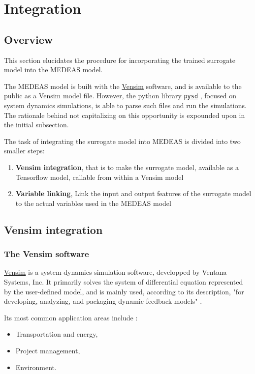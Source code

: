 \section{Integration}

\subsection{Overview}

This section elucidates the procedure for incorporating the trained surrogate model into the MEDEAS model.

The MEDEAS model is built with the \href{https://vensim.com/}{Vensim} software, and is available to the public as a Vensim model file. However, the python library \href{https://pysd.readthedocs.io/en/master/index.html}{\texttt{pysd}} \cite{pysd}, focused on system dynamics simulations, is able to parse such files and run the simulations. The rationale behind not capitalizing on this opportunity is expounded upon in the initial subsection.

The task of integrating the surrogate model into MEDEAS is divided into two smaller steps:
\begin{enumerate}
    \item \textbf{Vensim integration}, that is to make the surrogate model, available as a Tensorflow model, callable from within a Vensim model
    \item \textbf{Variable linking}, Link the input and output features of the surrogate model to the actual variables used in the MEDEAS model
\end{enumerate}

\subsection{Vensim integration}

\subsubsection{The Vensim software}

\href{https://vensim.com/}{Vensim} is a system dynamics simulation software, developped by Ventana Systems, Inc. It primarily solves the system of differential equation represented by the user-defined model, and is mainly used, according to its description, "for developing, analyzing, and packaging dynamic feedback models" \cite{vensim-website}.

Its most common application areas include \cite{wiki-vensim}:
\begin{itemize}
    \item Transportation and energy,
    \item Project management,
    \item Environment.
\end{itemize}

